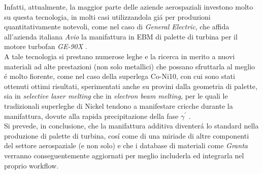 \documentclass{article}
\begin{document}
    Infatti, attualmente, la maggior parte delle aziende aerospaziali investono molto su questa tecnologia, 
    in molti casi utilizzandola giá per produzioni quantitativamente notevoli, come 
    nel caso di \textit{General Electric}, che affida all'azienda italiana \textit{Avio} la manifattura
    in EBM di palette di turbina per il motore turbofan \textit{GE-90X} \autocite{GE90X_EBM}. \\

    A tale tecnologia si prestano numerose leghe e la ricerca in merito a nuovi materiali ad alte prestazioni (non
    solo metallici)
    che possano sfruttarla al meglio é molto fiorente, come nel caso della superlega Co-Ni10, 
    con cui sono stati ottenuti ottimi risultati, sperimentati anche su provini
    dalla geometria di palette, sia in 
    \textit{selective laser melting} che in \textit{electron beam melting}, per le quali
    le tradizionali superleghe di Nickel tendono a manifestare cricche durante la
    manifattura, dovute alla rapida precipitazione della fase $\gamma^{'}$ \autocite{Co_Ni_EBM}. \\ 

    Si prevede, in conclusione, che la manifattura additiva diventerá lo standard nella produzione di palette
    di turbina, cosí come di una miriade di 
    altre componenti del settore aerospaziale (e non solo) e che i database di materiali come \textit{Granta} verranno conseguentemente aggiornati per 
    meglio includerla ed integrarla nel proprio workflow. 

    

    \clearpage

    \printbibliography
    
\end{document}
